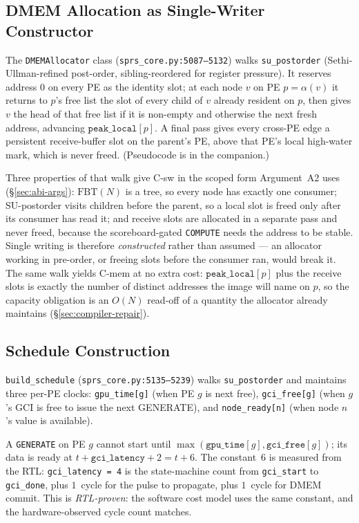 \documentclass[journal,10pt]{IEEEtran}
\theoremstyle{plain}
\theoremstyle{definition}
\theoremstyle{remark}
\newcommand{\FBT}{\ensuremath{\mathrm{FBT}}}
\newcommand{\sv}[1]{\texttt{#1}}
\newcommand{\asgn}{\ensuremath{\alpha}}
\begin{document}
\subsection{DMEM Allocation as Single-Writer Constructor}\label{sec:compiler-dmem}

The \sv{DMEMAllocator} class (\sv{sprs\_core.py:5087--5132}) walks
\sv{su\_postorder} (Sethi-Ullman-refined post-order, sibling-reordered for
register pressure). It reserves address $0$ on every PE as the identity
slot; at each node $v$ on PE $p = \asgn(v)$ it returns to $p$'s free list
the slot of every child of $v$ already resident on $p$, then gives $v$ the
head of that free list if it is non-empty and otherwise the next fresh
address, advancing $\texttt{peak\_local}[p]$. A final pass gives every
cross-PE edge a persistent receive-buffer slot on the parent's PE, above
that PE's local high-water mark, which is never freed. (Pseudocode is in
the companion.)

Three properties of that walk give \textsf{C-sw} in the scoped form
Argument~A2 uses (\S\ref{sec:abi-args}): $\FBT(N)$ is a tree, so every node
has exactly one consumer; SU-postorder visits children before the parent, so
a local slot is freed only after its consumer has read it; and receive slots
are allocated in a separate pass and never freed, because the
scoreboard-gated \texttt{COMPUTE} needs the address to be stable. Single
writing is therefore \emph{constructed} rather than assumed --- an allocator
working in pre-order, or freeing slots before the consumer ran, would break
it. The same walk yields \textsf{C-mem} at no extra cost: $\texttt{peak\_local}[p]$ plus
the receive slots is exactly the number of distinct addresses the image will
name on $p$, so the capacity obligation is an $O(N)$ read-off of a quantity
the allocator already maintains (\S\ref{sec:compiler-repair}).

\subsection{Schedule Construction}\label{sec:compiler-sched}

\sv{build\_schedule} (\sv{sprs\_core.py:5135--5239}) walks
\sv{su\_postorder} and maintains three per-PE clocks: \sv{gpu\_time[g]}
(when PE $g$ is next free), \sv{gci\_free[g]} (when $g$'s GCI is free to
issue the next GENERATE), and \sv{node\_ready[n]} (when node $n$'s
value is available).

A \texttt{GENERATE} on PE $g$ cannot start until
$\max(\sv{gpu\_time}[g], \sv{gci\_free}[g])$; its data is ready at
$t + \sv{gci\_latency} + 2 = t + 6$. The constant~$6$ is measured from
the RTL: \sv{gci\_latency = 4} is the state-machine count from
\texttt{gci\_start} to \texttt{gci\_done}, plus $1$~cycle for the pulse
to propagate, plus $1$~cycle for DMEM commit. This is
\emph{RTL-proven}: the software cost model uses the same constant, and
the hardware-observed cycle count matches.
\end{document}
